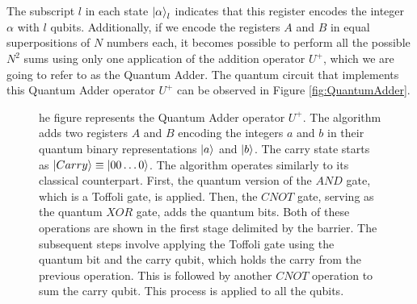 \documentclass[12pt, a4paper]{article}
\begin{document}
    The subscript $l$ in each state $\ket{\alpha}_l$ indicates that this register encodes the integer $\alpha$ with $l$ qubits. Additionally, if we encode the registers $A$ and $B$ in equal superpositions of $N$ numbers each, it becomes possible to perform all the possible $N^2$ sums using only one application of the addition operator $U^+$, which we are going to refer to as the Quantum Adder. The quantum circuit that implements this Quantum Adder operator $U^+$ can be observed in Figure \ref{fig:QuantumAdder}.

    \begin{figure}
        \centering
        \caption{he figure represents the Quantum Adder operator $U^+$. The algorithm adds two registers $A$ and $B$ encoding the integers $a$ and $b$ in their quantum binary representations $\ket{a}$ and $\ket{b}$. The carry state starts as $\ket{Carry}\equiv\ket{00\dots0}$. The algorithm operates similarly to its classical counterpart. First, the quantum version of the $AND$ gate, which is a Toffoli gate, is applied. Then, the $CNOT$ gate, serving as the quantum $XOR$ gate, adds the quantum bits. Both of these operations are shown in the first stage delimited by the barrier. The subsequent steps involve applying the Toffoli gate using the quantum bit and the carry qubit, which holds the carry from the previous operation. This is followed by another $CNOT$ operation to sum the carry qubit. This process is applied to all the qubits.}  

\end{figure}
\end{document}
